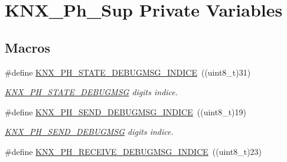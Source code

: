 \hypertarget{group___k_n_x___p_h___sup___private___variables}{}\section{K\+N\+X\+\_\+\+Ph\+\_\+\+Sup Private Variables}
\label{group___k_n_x___p_h___sup___private___variables}
\subsection*{Macros}
\begin{DoxyCompactItemize}
\item 
\#define \hyperlink{group___k_n_x___p_h___sup___private___variables_ga4337350e8fd2ce76fcfc8a820acff39e}{K\+N\+X\+\_\+\+P\+H\+\_\+\+S\+T\+A\+T\+E\+\_\+\+D\+E\+B\+U\+G\+M\+S\+G\+\_\+\+I\+N\+D\+I\+CE}~((uint8\+\_\+t)31)\hypertarget{group___k_n_x___p_h___sup___private___variables_ga4337350e8fd2ce76fcfc8a820acff39e}{}\label{group___k_n_x___p_h___sup___private___variables_ga4337350e8fd2ce76fcfc8a820acff39e}

\begin{DoxyCompactList}\small\item\em \hyperlink{group___k_n_x___p_h___sup___private___variables_gaa18f29dc3cf5b41ce81bcf264601d400}{K\+N\+X\+\_\+\+P\+H\+\_\+\+S\+T\+A\+T\+E\+\_\+\+D\+E\+B\+U\+G\+M\+SG} digits indice. \end{DoxyCompactList}\item 
\#define \hyperlink{group___k_n_x___p_h___sup___private___variables_gad1f9e6675f34456d40cf7c08b9bd305f}{K\+N\+X\+\_\+\+P\+H\+\_\+\+S\+E\+N\+D\+\_\+\+D\+E\+B\+U\+G\+M\+S\+G\+\_\+\+I\+N\+D\+I\+CE}~((uint8\+\_\+t)19)\hypertarget{group___k_n_x___p_h___sup___private___variables_gad1f9e6675f34456d40cf7c08b9bd305f}{}\label{group___k_n_x___p_h___sup___private___variables_gad1f9e6675f34456d40cf7c08b9bd305f}

\begin{DoxyCompactList}\small\item\em \hyperlink{group___k_n_x___p_h___sup___private___variables_ga16f43b8d36bcc39b90564fac102ac721}{K\+N\+X\+\_\+\+P\+H\+\_\+\+S\+E\+N\+D\+\_\+\+D\+E\+B\+U\+G\+M\+SG} digits indice. \end{DoxyCompactList}\item 
\#define \hyperlink{group___k_n_x___p_h___sup___private___variables_gacc017b9a5b70a1082a3713dbc43ac62c}{K\+N\+X\+\_\+\+P\+H\+\_\+\+R\+E\+C\+E\+I\+V\+E\+\_\+\+D\+E\+B\+U\+G\+M\+S\+G\+\_\+\+I\+N\+D\+I\+CE}~((uint8\+\_\+t)23)\hypertarget{group___k_n_x___p_h___sup___private___variables_gacc017b9a5b70a1082a3713dbc43ac62c}{}\label{group___k_n_x___p_h___sup___private___variables_gacc017b9a5b70a1082a3713dbc43ac62c}


\end{DoxyCompactItemize}
